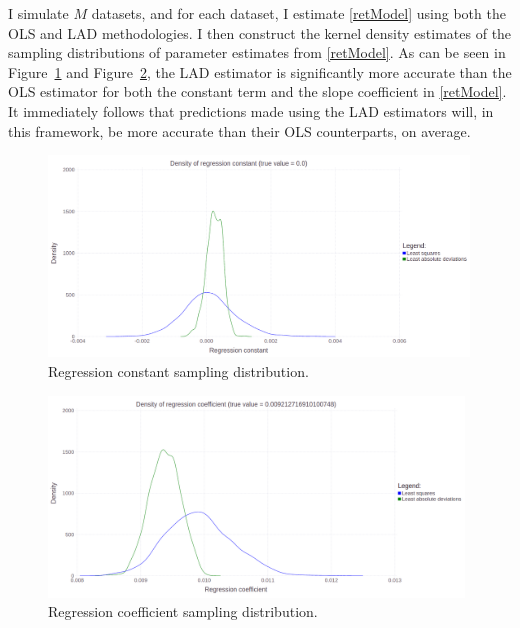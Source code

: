 \documentclass[12pt,a4paper]{amsart}
\begin{document}
I simulate $M$ datasets, and for each dataset, I estimate \eqref{retModel} using both the OLS and LAD methodologies. I then construct the kernel density estimates of the sampling distributions of parameter estimates from \eqref{retModel}. As can be seen in Figure~\ref{figConstantDensity} and Figure~\ref{figCoefDensity}, the LAD estimator is significantly more accurate than the OLS estimator for both the constant term and the slope coefficient in \eqref{retModel}. It immediately follows that predictions made using the LAD estimators will, in this framework, be more accurate than their OLS counterparts, on average.

\begin{figure}[htbp]
\centering
\includegraphics[height=5.35cm]{ConstantDensity.png}
\caption{\footnotesize{Regression constant sampling distribution.}}
\label{figConstantDensity}
\end{figure}



\begin{figure}[htbp]
\centering
\includegraphics[height=5.35cm]{CoefDensity.png}
\caption{\footnotesize{Regression coefficient sampling distribution.}}
\label{figCoefDensity}
\end{figure}
\end{document}
